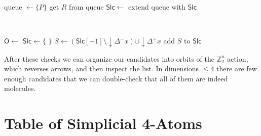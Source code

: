 \documentclass[12pt,a4paper]{article}
\numberwithin{equation}{section}
\begin{document}
\vspace{0.15cm}
\noindent
\begin{minipage}[t]{0.43\linewidth}
    \begin{algorithmic}[1]
        \ttfamily
            \State queue $\gets \{P\}$
                \State get $R$ from queue
                \State $\mathsf{Slc} \gets $ 
                    \State {}
                \EndIf
                    \State extend queue with $\mathsf{Slc}$
                \EndIf
            \EndWhile
            \State {}
        \EndFunction
    \end{algorithmic}
\end{minipage}\ \ \ \ \ \ \ 
%
\begin{minipage}[t]{0.5\linewidth}
    {\footnotesize
    \begin{algorithmic}[1]
        \ttfamily
            \State $\mathsf{O} \gets$ 
            \If{$\mathsf{O}$ is None}
                \State {}
            \EndIf
            \State $\mathsf{Slc} \gets \{\!\!\!$  $\!\!\!\}$
            \For{$x \in \mathsf{O}$}
                \State $S \gets \left( \mathsf{Slc}[-1] \setminus \downarrow \Delta^- x \right) \cup \downarrow \Delta^+ x$
                \State add $S$ to $\mathsf{Slc}$
            \EndFor
            \State {}
        \EndFunction
    \end{algorithmic}}
\end{minipage}
\vspace{0.3cm}

After these checks we can organize our candidates into orbits of the $\mathbb{Z}_2^n$ action, which reverses arrows, and then inspect the list. In dimensions $\leq 4$ there are few enough candidates that we can double-check that all of them are indeed molecules.

\section{Table of Simplicial 4-Atoms}\label{app:4_atoms_list}
\end{document}
